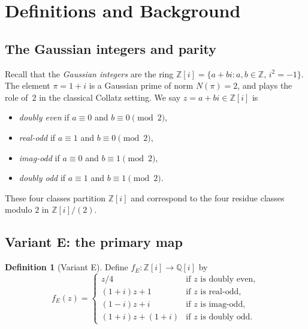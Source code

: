 \documentclass[12pt]{article}
\theoremstyle{plain}
\theoremstyle{definition}
\newtheorem{definition}[theorem]{Definition}
\theoremstyle{remark}
\theoremstyle{definition}
\newcommand{\Z}{\mathbb{Z}}
\newcommand{\Zi}{\mathbb{Z}[i]}
\newcommand{\Qi}{\mathbb{Q}[i]}
\begin{document}
\section{Definitions and Background}
\label{sec:definition}

\subsection{The Gaussian integers and parity}

Recall that the \emph{Gaussian integers} are the ring
$\Zi = \{a + bi : a,b\in\Z, \, i^2 = -1\}$.
The element $\pi = 1+i$ is a Gaussian prime of norm $N(\pi) = 2$,
and plays the role of~$2$ in the classical Collatz setting.
We say $z = a+bi \in \Zi$ is
\begin{itemize}
    \item \emph{doubly even} if $a \equiv 0$ and $b \equiv 0 \pmod 2$,
    \item \emph{real-odd} if $a \equiv 1$ and $b \equiv 0 \pmod 2$,
    \item \emph{imag-odd} if $a \equiv 0$ and $b \equiv 1 \pmod 2$,
    \item \emph{doubly odd} if $a \equiv 1$ and $b \equiv 1 \pmod 2$.
\end{itemize}
These four classes partition $\Zi$ and correspond to the four
residue classes modulo $2$ in $\Zi/(2)$.

\subsection{Variant E: the primary map}
\label{subsec:variantE}

\begin{definition}[Variant E]
Define $f_E : \Zi \to \Qi$ by
\begin{equation}
\label{eq:variantE}
    f_E(z) =
    \begin{cases}
        z/4              & \text{if } z \text{ is doubly even},   \\
        (1+i)z + 1       & \text{if } z \text{ is real-odd},      \\
        (1-i)z + i       & \text{if } z \text{ is imag-odd},      \\
        (1+i)z + (1+i)   & \text{if } z \text{ is doubly odd}.
    \end{cases}
\end{equation}
\end{definition}
\end{document}
